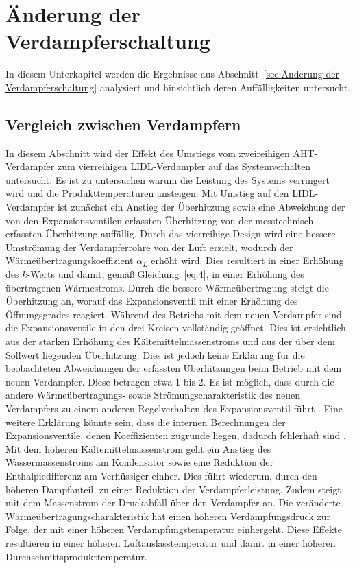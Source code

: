 \section{Änderung der Verdampferschaltung}
\label{sec:Änderung der Verdampferschaltung1}


In diesem Unterkapitel werden die Ergebnisse aus Abschnitt~\ref{sec:Änderung der Verdampferschaltung} analysiert und hinsichtlich deren Auffälligkeiten untersucht.

\subsection{Vergleich zwischen Verdampfern}
\label{subsec:Vergleich zwischen Verdampfern_1}

In diesem Abschnitt wird der Effekt des Umstiegs vom zweireihigen AHT-Verdampfer zum vierreihigen LIDL-Verdampfer auf das Systemverhalten untersucht. Es ist zu untersuchen warum die Leistung des Systems verringert wird und die Produkttemperaturen ansteigen. 
Mit Umstieg auf den LIDL-Verdampfer ist zunächst ein Anstieg der Überhitzung sowie eine Abweichung der von den Expansionsventilen erfassten Überhitzung von der messtechnisch erfassten Überhitzung auffällig. Durch das vierreihige Design wird eine bessere Umströmung der Verdampferrohre von der Luft erzielt, wodurch der Wärmeübertragungskoeffizient $\alpha_{L}$ erhöht wird. Dies resultiert in einer Erhöhung des $k$-Werts und damit, gemäß Gleichung~\ref{eq:4}, in einer Erhöhung des übertragenen Wärmestroms. Durch die bessere Wärmeübertragung steigt die Überhitzung an, worauf das Expansionsventil mit einer Erhöhung des Öffnungsgrades reagiert. Während des Betriebs mit dem neuen Verdampfer sind die Expansionsventile in den drei Kreisen vollständig geöffnet. Dies ist ersichtlich aus der starken Erhöhung des Kältemittelmassenstroms und aus der über dem Sollwert liegenden Überhitzung. Dies ist jedoch keine Erklärung für die beobachteten Abweichungen der erfassten Überhitzungen beim Betrieb mit dem neuen Verdampfer. Diese betragen etwa \unit{1}{\kelvin} bis \unit{2}{\kelvin}. Es ist möglich, dass durch die andere Wärmeübertragungs- sowie Strömungscharakteristik des neuen Verdampfers zu einem anderen Regelverhalten des Expansionsventil führt \cite{Winter.2012}. Eine weitere Erklärung könnte sein, dass die internen Berechnungen der Expansionsventile, denen Koeffizienten zugrunde liegen, dadurch fehlerhaft sind \cite{EmersonClimateTechnologies.2016}. Mit dem höheren Kältemittelmassenstrom geht ein Anstieg des Wassermassenstroms am Kondensator sowie eine Reduktion der Enthalpiedifferenz am Verflüssiger einher. Dies führt wiederum, durch den höheren Dampfanteil, zu einer Reduktion der Verdampferleistung. Zudem steigt mit dem Massenstrom der Druckabfall über den Verdampfer an. Die veränderte Wärmeübertragungscharakteristik hat einen höheren Verdampfungsdruck zur Folge, der mit einer höheren Verdampfungstemperatur einhergeht. Diese Effekte resultieren in einer höheren Luftauslasstemperatur und damit in einer höheren Durchschnittsprodukttemperatur. \newline
